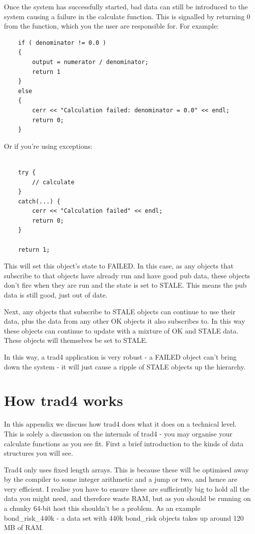 \documentclass{report}
\begin{document}
Once the system has successfully started, bad data can still be introduced to the system causing a failure in the calculate function. This is signalled by returning 0 from the function, which you the user are responsible for. For example:

\begin{verbatim}
    if ( denominator != 0.0 )
    {
        output = numerator / denominator;
        return 1
    }
    else
    {
        cerr << "Calculation failed: denominator = 0.0" << endl;
        return 0;   
    }
\end{verbatim}

Or if you're using exceptions:

\begin{verbatim}

    try {
        // calculate
    }
    catch(...) {
        cerr << "Calculation failed" << endl;
        return 0;
    }
    
    return 1;
\end{verbatim}

This will set this object's state to FAILED. In this case, as any objects that subscribe to that objects have already run and have good pub data, these objects don't fire when they are run and the state is set to STALE. This means the pub data is still good, just out of date.

Next, any objects that subscribe to STALE objects can continue to use their data, plus the data from any other OK objects it also subscribes to. In this way these objects can continue to update with a mixture of OK and STALE data. These objects will themselves be set to STALE.

In this way, a trad4 application is very robust - a FAILED object can't bring down the system - it will just cause a ripple of STALE objects up the hierarchy.

\appendix

\chapter{How trad4 works}

In this appendix we discuss how trad4 does what it does on a technical level. This is solely a discussion on the internals of trad4 - you may organise your calculate functions as you see fit.  First a brief introduction to the kinds of data structures you will see. 

Trad4 only uses fixed length arrays. This is because these will be optimised away by the compiler to some integer arithmetic and a jump or two, and hence are very efficient. I realise you have to ensure these are sufficiently big to hold all the data you might need, and therefore waste RAM, but as you should be running on a chunky 64-bit host this shouldn't be a problem. As an example bond_risk_440k - a data set with 440k bond_risk objects takes up around 120 MB of RAM. 
\end{document}
